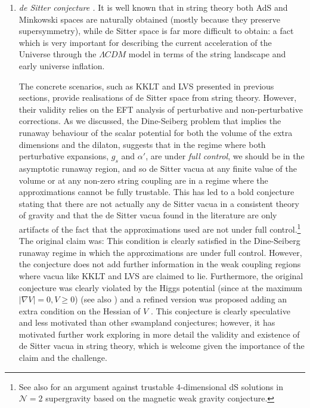 \begin{enumerate}
\item{\it de Sitter conjecture \cite{Obied:2018sgi}.} It is well known that in string theory both AdS and Minkowski spaces are naturally obtained (mostly because they preserve supersymmetry), while de Sitter space is far more difficult to obtain: a fact which is very important for describing the current acceleration of the Universe through the $\Lambda CDM$ model in terms of the string landscape and early universe inflation. 

The concrete scenarios, such as KKLT and LVS presented in previous sections, provide realisations of de Sitter space from string theory. However, their validity relies on the EFT analysis of perturbative and non-perturbative corrections. As we discussed, the Dine-Seiberg problem that implies the runaway behaviour of the scalar potential for both the volume of the extra dimensions and the dilaton, suggests that in the regime where both perturbative expansions, $g_s$ and $\alpha'$, are under {\it full control}, we should be in the asymptotic runaway region, and so de Sitter vacua at any finite value of the volume or at any non-zero string coupling are in a regime where the approximations cannot be fully trustable. This has led to a bold conjecture stating that there are not actually any de Sitter vacua in a consistent theory of gravity and that the de Sitter vacua found in the literature are only artifacts of the fact that the approximations used are not under full control.\footnote{See also \cite{Cribiori:2020use} for an argument against trustable 4-dimensional dS solutions in $\mathcal{N}=2$ supergravity based on the magnetic weak gravity conjecture.} The original claim was:
\be
\setlength\fboxsep{0.25cm}
\setlength\fboxrule{0.4pt}
\ee
This condition is clearly satisfied in the Dine-Seiberg runaway regime in which the approximations are under full control. However, the conjecture does not add further information in the weak coupling regions where vacua like KKLT and LVS are claimed to lie. Furthermore, the original conjecture was clearly violated by the Higgs potential (since at the maximum $|\nabla V|=0, V\geq 0$) \cite{Cicoli:2018kdo,Denef:2018etk} (see also \cite{Murayama:2018lie,Choi:2018rze,Hamaguchi:2018vtv}) and a refined version was proposed adding an extra condition on the Hessian of $V$ \cite{Garg:2018reu,Ooguri:2018wrx, Murayama:2018lie}. This conjecture is clearly speculative and less motivated than other swampland conjectures; however, it has motivated further work exploring in more detail  the validity and existence of de Sitter vacua in string theory, which is welcome given the importance of the claim and the challenge.


\end{enumerate}
